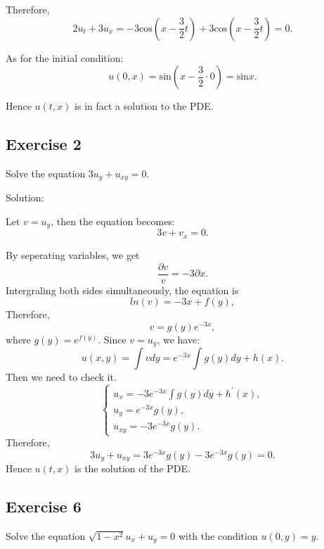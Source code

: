 \documentclass{article}
\begin{document}
			Therefore,
			\[ 2u_t +3u_x=-3\text{cos}\left(x-\frac{3}{2}t\right) + 3\text{cos}\left(x-\frac{3}{2}t\right)=0.\]

			As for the initial condition:
			\[u(0,x)=\text{sin}\left(x-\frac{3}{2}\cdot0\right)=\text{sin}x.\]

			Hence $u(t,x)$ is in fact a solution to the PDE.

		\subsection{Exercise 2}
		Solve the equation $3u_y + u_{xy} =0.$

			Solution:

			Let $v=u_y$, then the equation becomes:
			\[3v+v_x=0.\]
			
			By seperating variables, we get \[\frac{\partial v}{v}=-3\partial x.\]
			Intergraling both sides simultaneously, the equation is \[ ln(v) = -3x + f(y),  \]
			Therefore, \[ v = g(y)e^{-3x},\]
			where $g(y)=e^{f(y)}$.
			Since $v=u_y$, we have:
			\[u(x,y)=\int vdy = e^{-3x}\int g(y)dy + h(x).\]
			Then we need to check it.
			\begin{equation*}
				\begin{cases}
					u_{x}=-3e^{-3x}\int g(y)dy + h^{'}(x),
					\\
					u_{y}=e^{-3x} g(y),
					\\
					u_{xy}=-3e^{-3x} g(y).
				\end{cases}
			\end{equation*}
			Therefore, \[3u_y + u_{xy}=3e^{-3x} g(y)-3e^{-3x} g(y)=0.\]
            Hence $u(t,x)$ is the solution of the PDE.


    \subsection{Exercise 6}
	Solve the equation $\sqrt{1-x^2}u_x+u_y=0$ with the condition $u(0, y)=y.$
		
\end{document}
